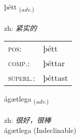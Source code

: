 \documentclass[frontgrid, backgrid]{flacards}\usepackage[]{graphicx}\usepackage[]{color}
\begin{document}
\renewcommand{\flhead}{\vskip5pt \fboxsep=0pt {\small\bfseries\footnotesize Atviksorð | 副词}}
\renewcommand{\fcfoot}{\vskip5pt \fboxsep=0pt \hspace{2pt}{\small\bfseries\footnotesize 2K}}

\renewcommand{\blhead}{\vskip5pt {\small\bfseries\footnotesize Atviksorð | 副词 }}
\renewcommand{\bcfoot}{\vskip5pt \hspace{2pt}{\small\bfseries\footnotesize 2K}}


{þétt \small{\textsubscript{(\textit{adv.})}} \\[1ex] %
\textphonetic{[θjɛht]} \\
zh: \emph{紧实的} \\  [2ex]
\renewcommand*{\arraystretch}{0.8}
\begin{tabular}{ll}
\textsc{pos}: & þétt \\ 
\textsc{comp.}: & þéttar \\ 
\textsc{superl.}: & þéttast \\
\end{tabular}
}


\renewcommand{\flhead}{\vskip5pt \fboxsep=0pt {\small\bfseries\footnotesize Atviksorð | 副词}}
\renewcommand{\fcfoot}{\vskip5pt \fboxsep=0pt \hspace{2pt}{\small\bfseries\footnotesize 2K}}

\renewcommand{\blhead}{\vskip5pt {\small\bfseries\footnotesize Atviksorð | 副词 }}
\renewcommand{\bcfoot}{\vskip5pt \hspace{2pt}{\small\bfseries\footnotesize 2K}}


{ágætlega \small{\textsubscript{(\textit{adv.})}} \\[1ex]
\textphonetic{[auːcaitlɛɣa]} \\
zh: \emph{很好，很棒} \\  [2ex]
ágætlega (Indeclinable)}

\renewcommand{\flhead}{\vskip5pt \fboxsep=0pt {\small\bfseries\footnotesize Sagnorð | 动词}}
\renewcommand{\fcfoot}{\vskip5pt \fboxsep=0pt \hspace{2pt}{\small\bfseries\footnotesize 2K}}
\end{document}
